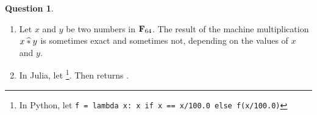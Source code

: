\documentclass[11pt]{article}
\theoremstyle{definition}
\newtheorem{question}{Question}
\theoremstyle{remark}
\theoremstyle{plain}%
\begin{document}
\begin{question}
\begin{enumerate}
        \item
            Let $x$ and $y$ be two numbers in $\mathbf F_{64}$.
            The result of the machine multiplication $x \mathbin{\widehat *} y$ is sometimes exact and sometimes not,
            depending on the values of $x$ and $y$.

        \item
            In Julia, let 
            \footnote{%
                In Python, let \texttt{f = lambda x: x if x == x/100.0 else f(x/100.0)}
            }.
            Then  returns .



    \end{enumerate}
\end{question}
\end{document}
